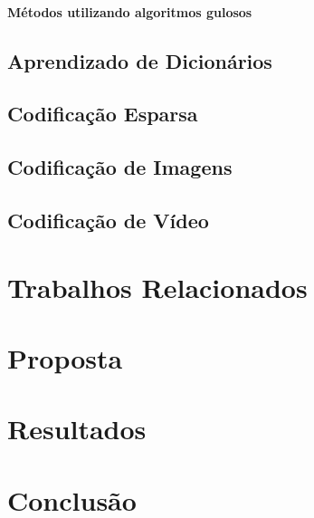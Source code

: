 \documentclass[cic,tc]{iiufrgs}
\begin{document}
\subsubsection{Métodos utilizando algoritmos gulosos}


\section{Aprendizado de Dicionários}

\section{Codificação Esparsa}

\section{Codificação de Imagens}

\section{Codificação de Vídeo}

\chapter{Trabalhos Relacionados}

\chapter{Proposta}

\chapter{Resultados}

\chapter{Conclusão}


% 



\end{document}
